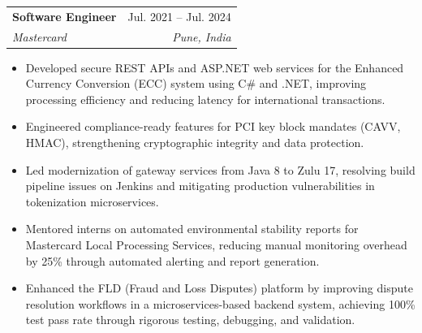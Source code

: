 \documentclass[letterpaper,10pt]{article}
\makeatletter
\newcommand{\resumeItem}[1]{
  \item\small{
    {#1 \vspace{-2pt}}
  }
}
\newcommand{\resumeSubheading}[4]{
  \vspace{-2pt}\item
    \begin{tabular*}{0.97\textwidth}[t]{l@{\extracolsep{\fill}}r}
      \textbf{#1} & #2 \\
      \textit{\small#3} & \textit{\small #4} \\
    \end{tabular*}\vspace{-7pt}
}
\newcommand{\resumeItemListStart}{\begin{itemize}[noitemsep, topsep=0pt, parsep=0pt]}
\newcommand{\resumeItemListEnd}{\end{itemize}\vspace{-5pt}}
\makeatother
\begin{document}

  \resumeSubheading
    {Software Engineer}{Jul. 2021 -- Jul. 2024}
    {Mastercard}{Pune, India}
    \resumeItemListStart
      \resumeItem{Developed secure REST APIs and ASP.NET web services for the Enhanced Currency Conversion (ECC) system using C\# and .NET, improving processing efficiency and reducing latency for international transactions.}
      \resumeItem{Engineered compliance-ready features for PCI key block mandates (CAVV, HMAC), strengthening cryptographic integrity and data protection.}
      \resumeItem{Led modernization of gateway services from Java 8 to Zulu 17, resolving build pipeline issues on Jenkins and mitigating production vulnerabilities in tokenization microservices.}
      \resumeItem{Mentored interns on automated environmental stability reports for Mastercard Local Processing Services, reducing manual monitoring overhead by 25\% through automated alerting and report generation.}
      \resumeItem{Enhanced the FLD (Fraud and Loss Disputes) platform by improving dispute resolution workflows in a microservices-based backend system, achieving 100\% test pass rate through rigorous testing, debugging, and validation.}
    \resumeItemListEnd

\end{document}
